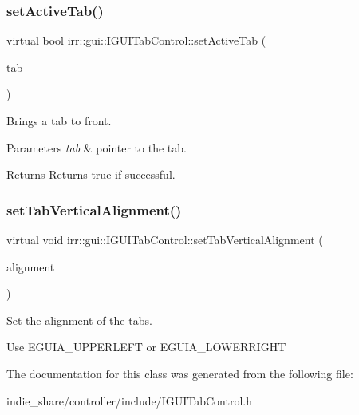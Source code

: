 \subsubsection{\texorpdfstring{set\+Active\+Tab()}{setActiveTab()}\hspace{0.1cm}{\footnotesize\ttfamily [2/2]}}
{\footnotesize\ttfamily virtual bool irr\+::gui\+::\+I\+G\+U\+I\+Tab\+Control\+::set\+Active\+Tab (\begin{DoxyParamCaption}\item[{\hyperlink{classirr_1_1gui_1_1IGUITab}{I\+G\+U\+I\+Tab} $\ast$}]{tab }\end{DoxyParamCaption})\hspace{0.3cm}{\ttfamily [pure virtual]}}



Brings a tab to front. 


\begin{DoxyParams}{Parameters}
{\em tab} & pointer to the tab. \\
\hline
\end{DoxyParams}
\begin{DoxyReturn}{Returns}
Returns true if successful. 
\end{DoxyReturn}
\mbox{\label{classirr_1_1gui_1_1IGUITabControl_a5481d1c15605d00654c12581842ad311}} 
\subsubsection{\texorpdfstring{set\+Tab\+Vertical\+Alignment()}{setTabVerticalAlignment()}}
{\footnotesize\ttfamily virtual void irr\+::gui\+::\+I\+G\+U\+I\+Tab\+Control\+::set\+Tab\+Vertical\+Alignment (\begin{DoxyParamCaption}\item[{\hyperlink{namespaceirr_1_1gui_a19eb5fb40e67f108cb16aba922ddaa2d}{gui\+::\+E\+G\+U\+I\+\_\+\+A\+L\+I\+G\+N\+M\+E\+NT}}]{alignment }\end{DoxyParamCaption})\hspace{0.3cm}{\ttfamily [pure virtual]}}



Set the alignment of the tabs. 

Use E\+G\+U\+I\+A\+\_\+\+U\+P\+P\+E\+R\+L\+E\+FT or E\+G\+U\+I\+A\+\_\+\+L\+O\+W\+E\+R\+R\+I\+G\+HT 

The documentation for this class was generated from the following file\+:\begin{DoxyCompactItemize}
\item 
indie\+\_\+share/controller/include/I\+G\+U\+I\+Tab\+Control.\+h\end{DoxyCompactItemize}
